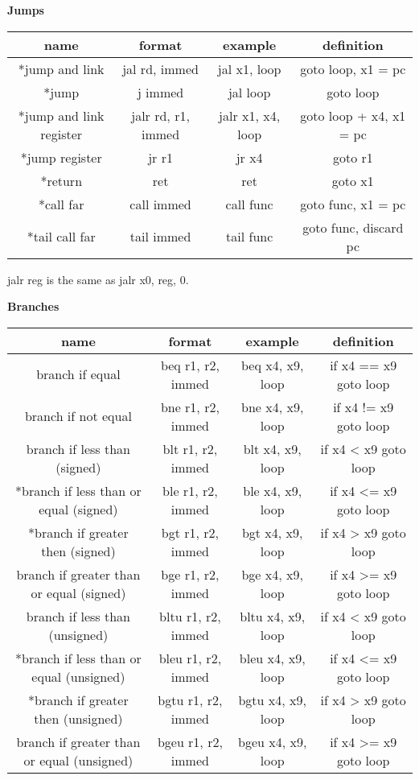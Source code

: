 \documentclass{article}
\begin{document}
\begin{center}
\textbf{Jumps}

  \begin{tabular}{|c|c|c|c|}
    \hline
    name            & format            & example          & definition \\
    \hline
    *jump and link & jal rd, immed & jal x1, loop & goto loop, x1 = pc \\
    *jump & j immed & jal loop & goto loop \\
    *jump and link register & jalr rd, r1, immed & jalr x1, x4, loop & goto loop
    + x4, x1 = pc \\
    *jump register & jr r1 & jr x4 & goto r1\\
    *return & ret & ret & goto x1 \\
    *call far & call immed & call func & goto func, x1 = pc \\
    *tail call far & tail immed & tail func & goto func, discard pc\\
    \hline
  \end{tabular}

  jalr reg is the same as jalr x0, reg, 0.


  \textbf{Branches}

  \begin{tabular}{|c|c|c|c|}
    \hline
    name                                       & format                & example           & definition            \\
    \hline
    branch if equal                            & beq r1, r2, immed     & beq x4, x9, loop  & if x4 == x9
    goto loop                                                                                                      \\
    branch if not equal                        & bne r1, r2, immed     & bne x4, x9, loop  & if x4 != x9 goto loop \\
    branch if less than (signed)               & blt r1, r2, immed     & blt x4, x9, loop  & if x4 < x9 goto loop  \\
    *branch if less than or equal (signed)      & ble r1, r2, immed     & ble x4, x9, loop  & if x4 <= x9 goto loop \\
    *branch if greater then (signed)            & bgt r1, r2, immed     & bgt x4, x9, loop  & if x4 > x9 goto loop  \\
    branch if greater than or equal (signed)   & bge r1, r2, immed     & bge x4, x9,
    loop                                       & if x4 >= x9 goto loop                                             \\
    branch if less than (unsigned)             & bltu r1, r2, immed    & bltu x4, x9, loop & if x4 < x9 goto loop  \\
    *branch if less than or equal (unsigned)    & bleu r1, r2, immed    & bleu x4, x9, loop & if x4 <= x9 goto loop \\
    *branch if greater then (unsigned)          & bgtu r1, r2, immed    & bgtu x4, x9, loop & if x4 > x9 goto loop  \\
    branch if greater than or equal (unsigned) & bgeu r1, r2, immed    & bgeu x4, x9, loop & if x4 >= x9 goto loop \\
    \hline
  \end{tabular}


\end{center}
\end{document}
